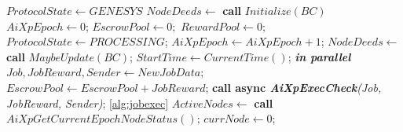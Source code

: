 \documentclass{article}
\begin{document}
\begin{algorithm}
\hspace*{5mm} 
\begin{algorithmic}[1]
    \State $ProtocolState \gets GENESYS$ \;\vspace{1mm}
    \State $NodeDeeds \gets$ \textbf{call} $Initialize(BC)$\; \vspace{1mm}
    \State $AiXpEpoch \gets 0$;\vspace{1mm}
    \State $EscrowPool \gets 0;$\vspace{1mm}
    \State $RewardPool \gets 0;$\vspace{1mm}
    \State $ProtocolState \gets PROCESSING$; \;\vspace{1mm}
    \vspace{1mm}
        \State $AiXpEpoch \gets AiXpEpoch + 1$;\vspace{1mm}
        \State $NodeDeeds \gets$ \textbf{call} $MaybeUpdate(BC)$;\vspace{1mm} \vspace{1mm}
        \State $StartTime \gets CurrentTime()$;\vspace{1mm}
        \vspace{1mm}
             \textbf{\textit{in parallel}}\vspace{1mm}
                \State $Job, JobReward, Sender \gets NewJobData$;\vspace{1mm}\vspace{1mm}
                \State $EscrowPool \gets EscrowPool + JobReward$;\vspace{1mm}
                \State \textbf{call async \textit{AiXpExecCheck}}\textit{(Job, JobReward, Sender)}; \ref{alg:jobexec}\vspace{1mm}
            \EndWhile\vspace{1mm}
        \EndWhile\vspace{1mm}
        \State $ActiveNodes \gets$ \textbf{call} $AiXpGetCurrentEpochNodeStatus()$;\vspace{1mm}
        \State $currNode \gets 0$;\vspace{1mm}
        \; \vspace{1mm}

\end{algorithmic}
\end{algorithm}
\end{document}

